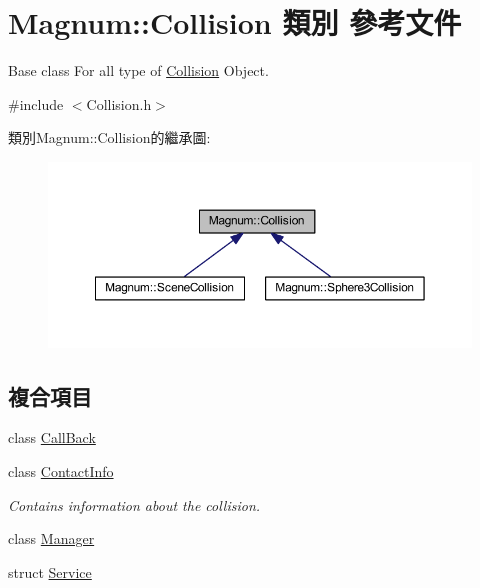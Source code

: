 \hypertarget{class_magnum_1_1_collision}{}\section{Magnum\+:\+:Collision 類別 參考文件}
\label{class_magnum_1_1_collision}


Base class For all type of \hyperlink{class_magnum_1_1_collision}{Collision} Object.  




{\ttfamily \#include $<$Collision.\+h$>$}



類別\+Magnum\+:\+:Collision的繼承圖\+:\nopagebreak
\begin{figure}[H]
\begin{center}
\leavevmode
\includegraphics[width=350pt]{class_magnum_1_1_collision__inherit__graph}
\end{center}
\end{figure}
\subsection*{複合項目}
\begin{DoxyCompactItemize}
\item 
class \hyperlink{class_magnum_1_1_collision_1_1_call_back}{Call\+Back}
\item 
class \hyperlink{class_magnum_1_1_collision_1_1_contact_info}{Contact\+Info}
\begin{DoxyCompactList}\small\item\em Contains information about the collision. \end{DoxyCompactList}\item 
class \hyperlink{class_magnum_1_1_collision_1_1_manager}{Manager}
\item 
struct \hyperlink{struct_magnum_1_1_collision_1_1_service}{Service}
\end{DoxyCompactItemize}
